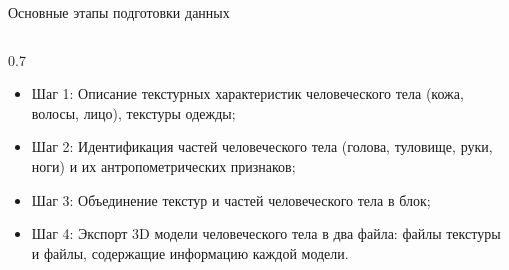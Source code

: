\documentclass[10pt,pdf,hyperref={unicode},xcolor=table]{beamer}
\begin{document}
\begin{frame}{Основные этапы подготовки данных}
\begin{columns}
		\begin{column} {0.7\textwidth}			
\begin{itemize}
	\item Шаг 1: Описание текстурных характеристик человеческого тела (кожа, волосы, лицо), текстуры одежды;
   \item Шаг 2: Идентификация частей человеческого тела (голова, туловище, руки, ноги) и их антропометрических признаков;
\item Шаг 3: Объединение текстур и частей человеческого тела в блок;
\item Шаг 4: Экспорт 3D модели человеческого тела в два файла: файлы текстуры и файлы, содержащие информацию каждой модели.
\end{itemize}


\end{column}
\end{columns}
\end{frame}
\end{document}
